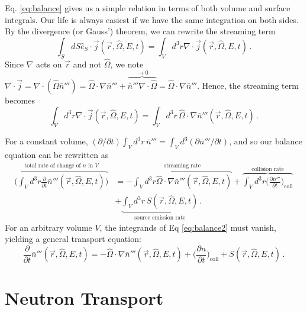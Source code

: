 Eq. \ref{eq:balance} gives us a simple relation in terms of both volume and 
surface integrals.  Our life is always easiest if we have the same integration 
on both sides.  By the divergence (or Gauss') theorem, we can rewrite the 
streaming term
\begin{equation}
 \int_S dS \hat{e}_S \cdot \vec{j}(\vec{r},\hat{\Omega},E,t) = \int_V d^3r \nabla \cdot \vec{j}(\vec{r},\hat{\Omega},E,t) \, .
\end{equation}
Since $\nabla$ acts on $\vec{r}$ and not $\hat{\Omega}$, we
note $ \nabla \cdot \vec{j} = \nabla \cdot (\hat{\Omega} \bar{n}''') =  
\hat{\Omega} \cdot \nabla \bar{n}''' + \overbrace{ \bar{n}''' \nabla 
\cdot \hat{\Omega}}^{\to 0} = \hat{\Omega} \cdot \nabla \bar{n}'''$.  
Hence, the streaming term becomes
\begin{equation}
 \int_V d^3r \nabla \cdot \vec{j}(\vec{r},\hat{\Omega},E,t) = 
   \int_V d^3r \, \hat{\Omega} \cdot \nabla \bar{n}'''(\vec{r},\hat{\Omega},E,t) \, .
\end{equation}

For a constant volume, $(\partial/\partial t) \int_V d^3 r \, \bar{n}''' = 
\int_V d^3 (\partial \bar{n}'''/\partial t)$, and so our balance equation can 
be rewritten as
\begin{equation}
\begin{split}
 \overbrace{  \Bigg ( \int_V d^3 r \frac{\partial}{\partial t}\bar{n}'''(\vec{r},\hat{\Omega},E,t) \Bigg ) }^{\text{total rate of change of }n\text{ in } V} 
      &=  - \overbrace{\int_V d^3r \hat{\Omega} \cdot \nabla \bar{n}'''(\vec{r},\hat{\Omega},E,t)}^{\text{streaming rate}}
       + \overbrace{ \int_V d^3 r \Big( \frac{\partial \bar{n}'''}{\partial t} \Big )_{\mathrm{coll}} }^{\text{collision rate}} \\
      &+ \underbrace{ \int_V d^3 r \, S(\vec{r},\hat{\Omega},E,t) }_{\text{source emission rate}}  \, .
\end{split}
\label{eq:balance2}
\end{equation}
For an arbitrary volume $V$, the integrands of Eq \ref{eq:balance2} must 
vanish, yielding a general transport equation:
\begin{equation}
  \frac{\partial}{\partial t}\bar{n}'''(\vec{r},\hat{\Omega},E,t) = 
    -\hat{\Omega} \cdot \nabla \bar{n}'''(\vec{r},\hat{\Omega},E,t) + 
    \Big( \frac{\partial n}{\partial t} \Big )_{\mathrm{coll}} +  S(\vec{r},\hat{\Omega},E,t) \, .
\label{eq:general_te}
\end{equation}


\section{Neutron Transport}

